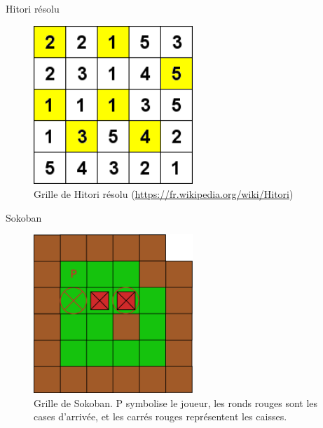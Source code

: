 \documentclass{beamer}
\begin{document}
\begin{frame}{Hitori résolu}
	\begin{figure}[!h]
		\includegraphics[width=6cm]{Hitori_2.png}
		\caption{Grille de Hitori résolu (\href{https://fr.wikipedia.org/wiki/Hitori}{https://fr.wikipedia.org/wiki/Hitori})}
		\label{label-figure2}
	\end{figure}
\end{frame}

\begin{frame}{Sokoban}
	\begin{figure}[!h]
		\includegraphics[width=6cm]{Diagram1.eps}
		\caption{Grille de Sokoban. P symbolise le joueur, les ronds rouges sont les cases d'arrivée, et les carrés rouges représentent les caisses.}
		\label{label-figure3}
	\end{figure}
\end{frame}
\end{document}
